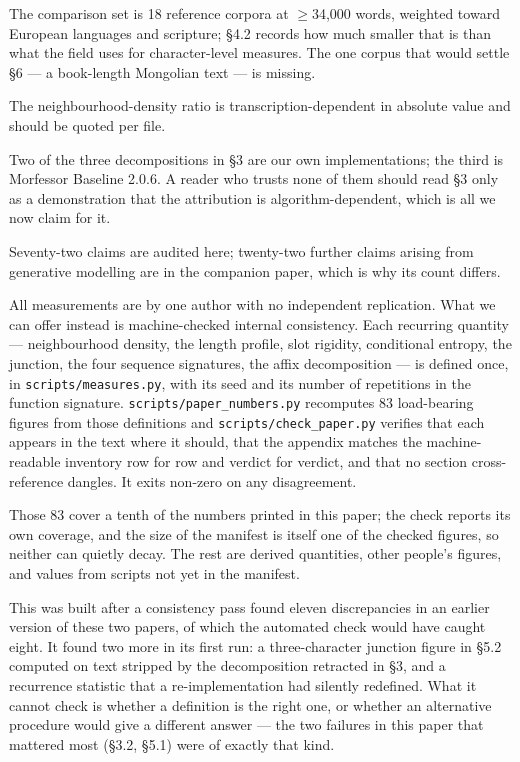 \documentclass[11pt,a4paper]{article}
\begin{document}
The comparison set is 18 reference corpora at $\geq$34,000 words, weighted toward European languages and scripture; \S4.2 records how much smaller that is than what the field uses for character-level measures. The one corpus that would settle \S6 --- a book-length Mongolian text --- is missing.


The neighbourhood-density ratio is transcription-dependent in absolute value and should be quoted per file.


Two of the three decompositions in \S3 are our own implementations; the third is Morfessor Baseline 2.0.6. A reader who trusts none of them should read \S3 only as a demonstration that the attribution is algorithm-dependent, which is all we now claim for it.


Seventy-two claims are audited here; twenty-two further claims arising from generative modelling are in the companion paper, which is why its count differs.


All measurements are by one author with no independent replication. What we can offer instead is machine-checked internal consistency. Each recurring quantity --- neighbourhood density, the length profile, slot rigidity, conditional entropy, the junction, the four sequence signatures, the affix decomposition --- is defined once, in \texttt{scripts/measures.py}, with its seed and its number of repetitions in the function signature. \texttt{scripts/paper\_numbers.py} recomputes 83 load-bearing figures from those definitions and \texttt{scripts/check\_paper.py} verifies that each appears in the text where it should, that the appendix matches the machine-readable inventory row for row and verdict for verdict, and that no section cross-reference dangles. It exits non-zero on any disagreement.


Those 83 cover a tenth of the numbers printed in this paper; the check reports its own coverage, and the size of the manifest is itself one of the checked figures, so neither can quietly decay. The rest are derived quantities, other people's figures, and values from scripts not yet in the manifest.


This was built after a consistency pass found eleven discrepancies in an earlier version of these two papers, of which the automated check would have caught eight. It found two more in its first run: a three-character junction figure in \S5.2 computed on text stripped by the decomposition retracted in \S3, and a recurrence statistic that a re-implementation had silently redefined. What it cannot check is whether a definition is the right one, or whether an alternative procedure would give a different answer --- the two failures in this paper that mattered most (\S3.2, \S5.1) were of exactly that kind.
\end{document}
